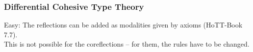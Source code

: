 \documentclass{beamer}
\newcommand{\Cored}{\Im}
\begin{document}
\begin{frame}
  \frametitle{Differential Cohesive Type Theory}
  Easy: The reflections can be added as modalities given by axioms (HoTT-Book 7.7). \\
  This is not possible for the coreflections -- for them, the rules have to be changed.
\end{frame}
\end{document}
